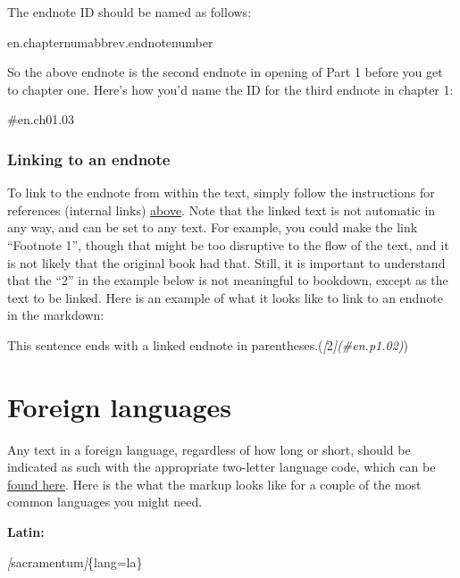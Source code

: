 \documentclass[
]{book}
\newenvironment{Shaded}{\begin{snugshade}}{\end{snugshade}}
\newcommand{\CommentTok}[1]{\textcolor[rgb]{0.56,0.35,0.01}{\textit{#1}}}
\newcommand{\NormalTok}[1]{#1}
\newcommand{\OtherTok}[1]{\textcolor[rgb]{0.56,0.35,0.01}{#1}}
\begin{document}
The endnote ID should be named as follows:

en.chapternumabbrev.endnotenumber

So the above endnote is the second endnote in opening of Part 1 before you get to chapter one. Here's how you'd name the ID for the third endnote in chapter 1:

\#en.ch01.03

\hypertarget{linking-to-an-endnote}{%
\subsection{Linking to an endnote}\label{linking-to-an-endnote}}

To link to the endnote from within the text, simply follow the instructions for references (internal links) \protect\hyperlink{references}{above}. Note that the linked text is not automatic in any way, and can be set to any text. For example, you could make the link ``Footnote 1'', though that might be too disruptive to the flow of the text, and it is not likely that the original book had that. Still, it is important to understand that the ``2'' in the example below is not meaningful to bookdown, except as the text to be linked. Here is an example of what it looks like to link to an endnote in the markdown:

\begin{Shaded}
\begin{Highlighting}[]
\NormalTok{This sentence ends with a linked endnote in parentheses.(}\CommentTok{[}\OtherTok{2}\CommentTok{](\#en.p1.02)}\NormalTok{)}
\end{Highlighting}
\end{Shaded}

\hypertarget{foreign-languages}{%
\chapter{Foreign languages}\label{foreign-languages}}

Any text in a foreign language, regardless of how long or short, should be indicated as such with the appropriate two-letter language code, which can be \href{https://www.w3schools.com/tags/ref_language_codes.asp}{found here}. Here is the what the markup looks like for a couple of the most common languages you might need.

\textbf{Latin:}

\begin{Shaded}
\begin{Highlighting}[]
\CommentTok{[}\OtherTok{sacramentum}\CommentTok{]}\NormalTok{\{lang=la\}}
\end{Highlighting}
\end{Shaded}
\end{document}
